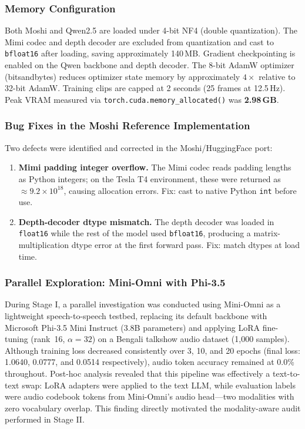 \documentclass[conference]{IEEEtran}
\begin{document}
\subsubsection{Memory Configuration}

Both Moshi and Qwen2.5 are loaded under 4-bit NF4 (double quantization).
The Mimi codec and depth decoder are excluded from quantization and cast to
\texttt{bfloat16} after loading, saving approximately 140\,MB.
Gradient checkpointing is enabled on the Qwen backbone and depth decoder.
The 8-bit AdamW optimizer (bitsandbytes) reduces optimizer state memory by
approximately $4\times$ relative to 32-bit AdamW.
Training clips are capped at 2 seconds (25 frames at 12.5\,Hz).
Peak VRAM measured via \texttt{torch.cuda.memory\_allocated()} was
\textbf{2.98\,GB}.

\subsubsection{Bug Fixes in the Moshi Reference Implementation}

Two defects were identified and corrected in the Moshi/HuggingFace port:

\begin{enumerate}
  \item \textbf{Mimi padding integer overflow.} The Mimi codec reads padding
        lengths as Python integers; on the Tesla T4 environment, these were
        returned as $\approx 9.2 \times 10^{18}$, causing allocation errors.
        Fix: cast to native Python \texttt{int} before use.
  \item \textbf{Depth-decoder dtype mismatch.} The depth decoder was loaded
        in \texttt{float16} while the rest of the model used \texttt{bfloat16},
        producing a matrix-multiplication dtype error at the first forward pass.
        Fix: match dtypes at load time.
\end{enumerate}

\subsubsection{Parallel Exploration: Mini-Omni with Phi-3.5}

During Stage I, a parallel investigation was conducted using Mini-Omni as a
lightweight speech-to-speech testbed, replacing its default backbone with
Microsoft Phi-3.5 Mini Instruct (3.8B parameters) and applying LoRA fine-tuning
(rank~16, $\alpha=32$) on a Bengali talkshow audio dataset (1,000 samples).
Although training loss decreased consistently over 3, 10, and 20 epochs (final
loss: 1.0640, 0.0777, and 0.0514 respectively), audio token accuracy remained
at 0.0\% throughout.
Post-hoc analysis revealed that this pipeline was effectively a text-to-text
swap: LoRA adapters were applied to the text LLM, while evaluation labels were
audio codebook tokens from Mini-Omni's audio head---two modalities with zero
vocabulary overlap.
This finding directly motivated the modality-aware audit performed in Stage II.
\end{document}
